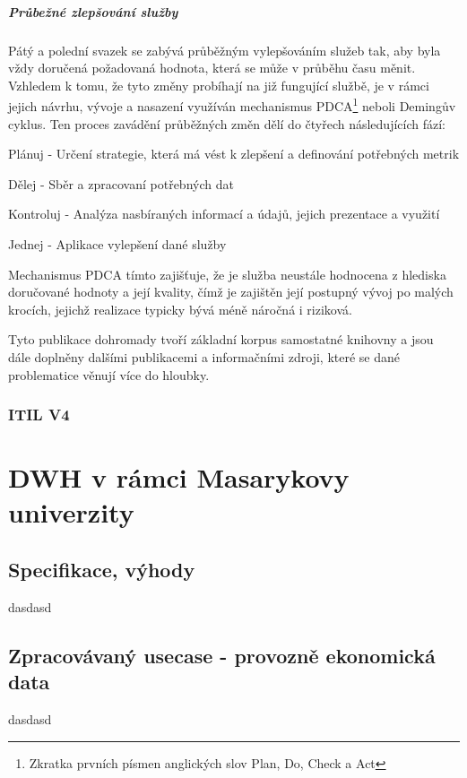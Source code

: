 \documentclass[
  digital,     %
  twoside,     %
  lof,         %
  lot,         %
]{fithesis4}
\begin{document}
\paragraph{Průbežné zlepšování služby}
Pátý a polední svazek se zabývá průběžným vylepšováním služeb tak, aby byla vždy doručená požadovaná hodnota, která se může v průběhu času měnit. Vzhledem k tomu, že tyto změny probíhají na již fungující službě, je v rámci jejich návrhu, vývoje a nasazení využíván mechanismus PDCA\footnote{Zkratka prvních písmen anglických slov Plan, Do, Check a Act} neboli Demingův cyklus. Ten proces zavádění průběžných změn dělí do čtyřech následujících fází: \parencite[s.~38]{Matula2017}
\begin{compactitem}
    \item Plánuj - Určení strategie, která má vést k zlepšení a definování potřebných metrik
    \item Dělej - Sběr a zpracovaní potřebných dat
    \item Kontroluj - Analýza nasbíraných informací a údajů, jejich prezentace a využití
    \item Jednej - Aplikace vylepšení dané služby
\end{compactitem}
Mechanismus PDCA tímto zajišťuje, že je služba neustále hodnocena z hlediska doručované hodnoty a její kvality, čímž je zajištěn její postupný vývoj po malých krocích, jejichž realizace typicky bývá méně náročná i riziková. 

Tyto publikace dohromady tvoří základní korpus samostatné knihovny a jsou dále doplněny dalšími publikacemi a informačními zdroji, které se dané problematice věnují více do hloubky. \parencite[s.~8]{Carlidge2007}

\subsection{ITIL V4}



\chapter{DWH v rámci Masarykovy univerzity}
\section{Specifikace, výhody}
dasdasd

\section{Zpracovávaný usecase - provozně ekonomická data}
dasdasd
\end{document}
